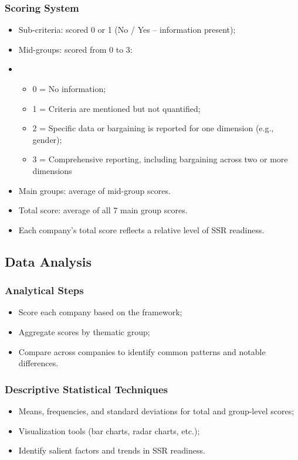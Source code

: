 \subsubsection{Scoring System}
\begin{itemize}
    \item Sub-criteria: scored 0 or 1 (No / Yes -- information present);
    \item Mid-groups: scored from 0 to 3:
    \item \begin{itemize}
        \item 0 = No information;
        \item 1 = Criteria are mentioned but not quantified;
        \item 2 = Specific data or bargaining is reported for one dimension (e.g., gender);
        \item 3 = Comprehensive reporting, including bargaining across two or more dimensions
    \end{itemize}
    \item Main groups: average of mid-group scores.
    \item Total score: average of all 7 main group scores.
    \item Each company’s total score reflects a relative level of SSR readiness.
\end{itemize}

\subsection{Data Analysis}
\subsubsection{Analytical Steps}
\begin{itemize}
    \item Score each company based on the framework;
    \item Aggregate scores by thematic group;
    \item Compare across companies to identify common patterns and notable differences.
\end{itemize}

\subsubsection{Descriptive Statistical Techniques}
\begin{itemize}
    \item Means, frequencies, and standard deviations for total and group-level scores;
    \item Visualization tools (bar charts, radar charts, etc.);
    \item Identify salient factors and trends in SSR readiness.
\end{itemize}

